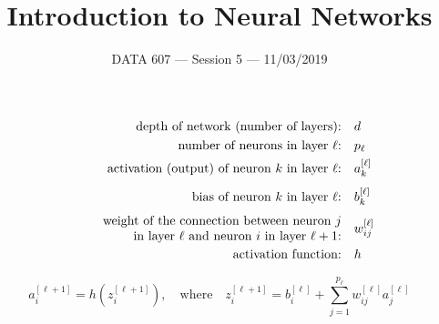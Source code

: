 \documentclass{beamer}
\begin{document}
    
\setlength{\parskip}{1em}
\begin{frame}
    \title{Introduction to Neural Networks}
    \date{DATA 607 --- Session 5 --- 11/03/2019}
    \maketitle
\end{frame}

\begin{frame}{}
    \begin{align*}
        \text{depth of network (number of layers):\quad}&d\\
        \text{number of neurons in layer $\ell$:\quad}&p_\ell\\
        \text{activation (output) of neuron $k$ in layer $\ell$:\quad}
        & a_k^{[\ell]}\\[1ex]
        \text{bias of neuron $k$ in layer $\ell$:\quad}& b_k^{[\ell]}\\[1ex]
        \text{\parbox{3in}{\raggedleft weight of the connection between neuron $j$\\
        in layer $\ell$ and neuron $i$ in layer $\ell+1$:}\quad}& w^{[\ell]}_{ij}\\
        \text{activation function:\quad}&h
    \end{align*}

    \[
        a^{[\ell+1]}_i = h\left(z_i^{[\ell+1]}\right),
        \quad\text{where}\quad
        z_i^{[\ell+1]}=b_i^{[\ell]} + \sum_{j=1}^{p_\ell} w_{ij}^{[\ell]}a_j^{[\ell]}
    \]
\end{frame}
\end{document}
